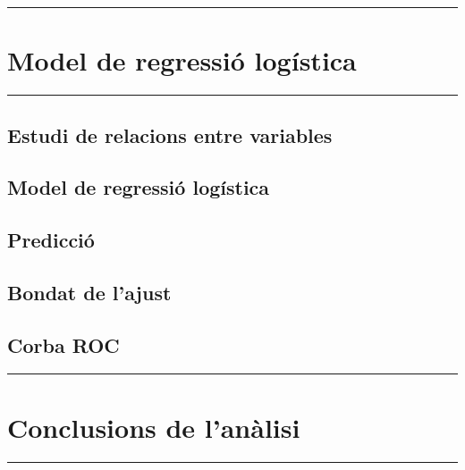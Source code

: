 \documentclass[
]{article}
\begin{document}
\begin{center}\rule{0.5\linewidth}{0.5pt}\end{center}

\hypertarget{model-de-regressiuxf3-loguxedstica}{%
\section{Model de regressió
logística}\label{model-de-regressiuxf3-loguxedstica}}

\begin{center}\rule{0.5\linewidth}{0.5pt}\end{center}

\hypertarget{estudi-de-relacions-entre-variables}{%
\subsection{Estudi de relacions entre
variables}\label{estudi-de-relacions-entre-variables}}

\hypertarget{model-de-regressiuxf3-loguxedstica-1}{%
\subsection{Model de regressió
logística}\label{model-de-regressiuxf3-loguxedstica-1}}

\hypertarget{predicciuxf3}{%
\subsection{Predicció}\label{predicciuxf3}}

\hypertarget{bondat-de-lajust}{%
\subsection{Bondat de l'ajust}\label{bondat-de-lajust}}

\hypertarget{corba-roc}{%
\subsection{Corba ROC}\label{corba-roc}}

\begin{center}\rule{0.5\linewidth}{0.5pt}\end{center}

\hypertarget{conclusions-de-lanuxe0lisi}{%
\section{Conclusions de l'anàlisi}\label{conclusions-de-lanuxe0lisi}}

\begin{center}\rule{0.5\linewidth}{0.5pt}\end{center}
\end{document}
